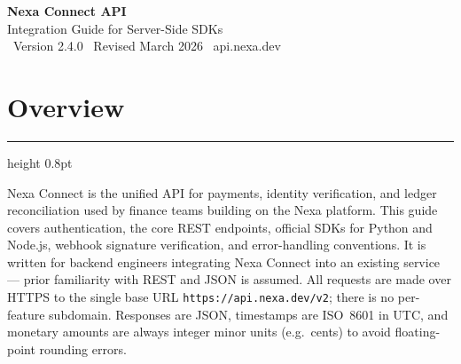 \documentclass[10pt]{article}
\begin{document}
\thispagestyle{empty}

\begin{tcolorbox}[
  enhanced, colback=nexanavy, colframe=nexanavy, arc=4pt,
  boxrule=0pt, left=8mm, right=8mm, top=7mm, bottom=7mm
]
\begin{minipage}[c]{0.14\textwidth}
\end{minipage}%
\begin{minipage}[c]{0.86\textwidth}
  {\color{white}\sffamily\Huge\bfseries Nexa Connect API}\\[2pt]
  {\color{nexateal!60!white}\sffamily\Large Integration Guide for Server-Side SDKs}\\[6pt]
  {\color{white!80!black}\sffamily\small \faTag\ Version 2.4.0 \quad\textbar\quad \faCalendar\ Revised March 2026 \quad\textbar\quad \faGlobe\ api.nexa.dev}
\end{minipage}
\end{tcolorbox}

\vspace{2mm}

\section*{\color{nexanavy}\Large\bfseries Overview}
\vspace{-2mm}
{\color{softline}\hrule height 0.8pt}
\vspace{2mm}

Nexa Connect is the unified API for payments, identity verification, and ledger
reconciliation used by finance teams building on the Nexa platform. This guide covers
authentication, the core REST endpoints, official SDKs for Python and Node.js, webhook
signature verification, and error-handling conventions. It is written for backend engineers
integrating Nexa Connect into an existing service --- prior familiarity with REST and JSON is
assumed. All requests are made over HTTPS to the single base URL \texttt{https://api.nexa.dev/v2};
there is no per-feature subdomain. Responses are JSON, timestamps are ISO~8601 in UTC, and
monetary amounts are always integer minor units (e.g.\ cents) to avoid floating-point rounding
errors.
\end{document}

